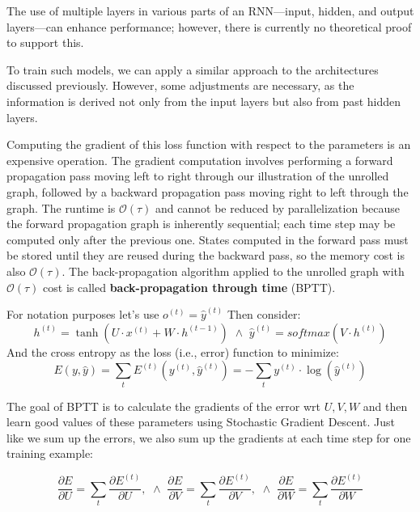 The use of multiple layers in various parts of an RNN—input, hidden, and output layers—can enhance
performance; however, there is currently no theoretical proof to support this.

To train such models, we can apply a similar approach to the architectures discussed previously. However, 
some adjustments are necessary, as the information is derived not only from the input layers but also from 
past hidden layers. 

Computing the gradient of this loss function with respect to the parameters is an expensive operation. 
The gradient computation involves performing a forward propagation pass moving left to right through our 
illustration of the unrolled graph, followed by a backward propagation pass moving right to left through 
the graph. The runtime is $\mathcal{O}(\tau)$ and cannot be reduced by parallelization because the forward
propagation graph is inherently sequential; each time step may be computed only after the previous one.
States computed in the forward pass must be stored until they are reused during the backward pass, so the 
memory cost is also $\mathcal{O}(\tau)$. The back-propagation algorithm applied to the unrolled graph with 
$\mathcal{O}(\tau)$ cost is called \textbf{back-propagation through time} (BPTT).

For notation purposes let’s use $o^{(t)} =  \hat{y}^{(t)}$ Then consider:
\begin{equation}
    h^{(t)} = \tanh (U \cdot x^{(t)} + W \cdot h^{(t - 1)}) \,\, \land \,\, \hat{y}^{(t)} = softmax(V \cdot h^{(t)})
\end{equation}
And the cross entropy as the loss (i.e., error) function to minimize:
\begin{equation}
    E(y, \hat{y}) = \sum_t E^{(t)}(y^{(t)}, \hat{y}^{(t)}) = - \sum_t y^{(t)} \cdot \log(\hat{y}^{(t)})  
\end{equation}

The goal of BPTT is to calculate the gradients of the error wrt $U, V, W$ and then learn good values 
of these parameters using Stochastic Gradient Descent. Just like we sum up the errors, we also sum up 
the gradients at each time step for one training example:

\begin{equation}
    \frac{\partial E}{\partial U} = \sum_t \frac{\partial E^{(t)}}{\partial U}, \,\, \land \,\, \frac{\partial E}{\partial V} = \sum_t \frac{\partial E^{(t)}}{\partial V}, \,\, \land \,\, \frac{\partial E}{\partial W} = \sum_t \frac{\partial E^{(t)}}{\partial W}
\end{equation}

